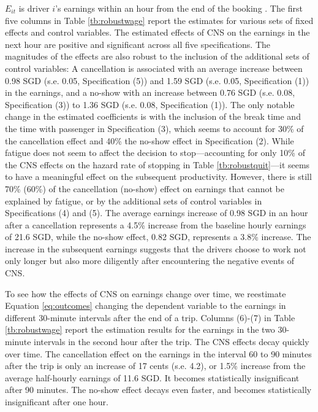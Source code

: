 \documentclass[reviewmode,AEJ]{AEA}
\begin{document}
$E_{it}$ is driver $i$'s earnings within an hour from the end of the booking%
. The first five columns in Table \ref{tb:robustwage} report the estimates for various sets of fixed effects and control variables. The estimated effects of CNS on the earnings in the next hour are positive and significant across all five specifications. The magnitudes of the effects are also robust to the inclusion of the additional sets of control variables: A cancellation is associated with an average increase between 0.98 SGD (s.e. 0.05, Specification (5)) and 1.59 SGD (s.e. 0.05, Specification (1)) in the earnings, and a no-show with an increase between 0.76 SGD (s.e. 0.08, Specification (3)) to 1.36 SGD (s.e. 0.08, Specification (1)). The only notable change in the estimated coefficients is with the inclusion of the break time and the time with passenger in Specification (3), which seems to account for 30\% of the cancellation effect and 40\% the no-show effect in Specification (2). While fatigue does not seem to affect the decision to stop---accounting for only 10\% of the CNS effects on the hazard rate of stopping in Table \ref{tb:robustquit}---it seems to have a meaningful effect on the subsequent productivity. However, there is still 70\% (60\%) of the cancellation (no-show) effect %
on earnings that cannot be explained by fatigue, or by the additional sets of control variables in Specifications (4) and (5). The average earnings increase of 0.98 SGD in an hour after a cancellation %
represents a 4.5\% increase from the baseline hourly earnings of 21.6 SGD, while the no-show effect, 0.82 SGD, represents a 3.8\% increase. The increase in the subsequent earnings suggests that the drivers choose to work not only  longer but also more diligently after encountering the negative events of CNS.


To see how the effects of CNS on earnings change over time, we reestimate Equation \eqref{eq:outcomes} changing the dependent variable to the earnings in different 30-minute intervals after the end of a trip. Columns (6)-(7) in Table \ref{tb:robustwage} report the estimation results for the earnings in the two 30-minute intervals in the second hour after the trip. The CNS effects decay quickly over time. The cancellation effect on the earnings in the interval 60 to 90 minutes after the trip is only an increase of 17 cents (s.e. 4.2), or 1.5\% increase from the average half-hourly earnings of 11.6 SGD. It becomes statistically insignificant after 90 minutes. The no-show effect decays even faster, and becomes statistically insignificant after one hour.
\end{document}
